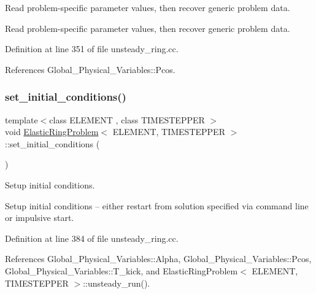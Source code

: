 Read problem-\/specific parameter values, then recover generic problem data. 

Read problem-\/specific parameter values, then recover generic problem data. 

Definition at line 351 of file unsteady\+\_\+ring.\+cc.



References Global\+\_\+\+Physical\+\_\+\+Variables\+::\+Pcos.

\mbox{\label{classElasticRingProblem_ab435f36b59e5f76301123c3440363704}} 
\subsubsection{\texorpdfstring{set\+\_\+initial\+\_\+conditions()}{set\_initial\_conditions()}}
{\footnotesize\ttfamily template$<$class E\+L\+E\+M\+E\+NT , class T\+I\+M\+E\+S\+T\+E\+P\+P\+ER $>$ \\
void \hyperlink{classElasticRingProblem}{Elastic\+Ring\+Problem}$<$ E\+L\+E\+M\+E\+NT, T\+I\+M\+E\+S\+T\+E\+P\+P\+ER $>$\+::set\+\_\+initial\+\_\+conditions (\begin{DoxyParamCaption}{ }\end{DoxyParamCaption})}



Setup initial conditions. 

Setup initial conditions -- either restart from solution specified via command line or impulsive start. 

Definition at line 384 of file unsteady\+\_\+ring.\+cc.



References Global\+\_\+\+Physical\+\_\+\+Variables\+::\+Alpha, Global\+\_\+\+Physical\+\_\+\+Variables\+::\+Pcos, Global\+\_\+\+Physical\+\_\+\+Variables\+::\+T\+\_\+kick, and Elastic\+Ring\+Problem$<$ E\+L\+E\+M\+E\+N\+T, T\+I\+M\+E\+S\+T\+E\+P\+P\+E\+R $>$\+::unsteady\+\_\+run().

\mbox{\label{classElasticRingProblem_acd30c4363ffedbaadc1523aa8b85523b}} 
